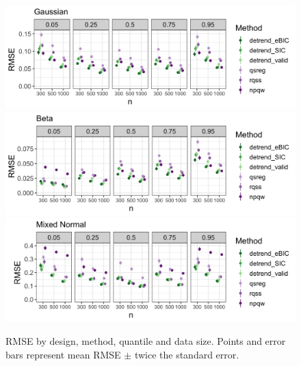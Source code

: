 \documentclass[12pt]{article}
\begin{document}
	\begin{figure}
		\caption{RMSE by design, method, quantile and data size. Points and error bars represent mean RMSE $\pm$ twice the standard error.}
		\includegraphics[width=\linewidth]{Figures/gaus_mse.png}	
		\includegraphics[width=\linewidth]{Figures/shapebeta_mse.png}
		\includegraphics[width=\linewidth]{Figures/mixednorm_mse.png}
		\label{fig:quantile_mse}
	\end{figure}
\end{document}
